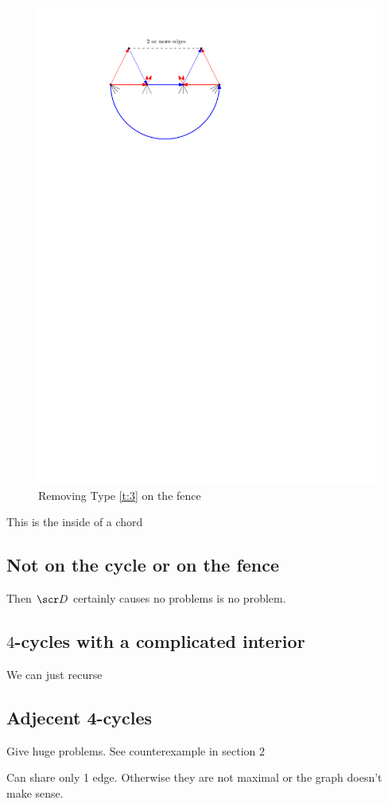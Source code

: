   \begin{figure}[h]
    \centering
    \includegraphics[scale=1]{4cycles/img/fence_d}
    \caption{Removing Type \ref{t:3} on the fence}
    \label{fig:4c:fence_d}
  \end{figure}



    This is the inside of a chord

\subsection{Not on the cycle or on the fence}
  Then $\D$ certainly causes no problems  is no problem.

\subsection{$4$-cycles with a complicated interior}
  We can just recurse

\subsection{Adjecent 4-cycles}
  Give huge problems. See counterexample in section 2

  Can share only 1 edge. Otherwise they are not maximal or the graph doesn't make sense.
